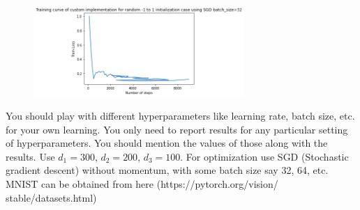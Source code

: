 \documentclass[a4paper]{article}
\theoremstyle{definition}
\newenvironment{soln}{
    \leavevmode\color{blue}\ignorespaces
}{}
\begin{document}
\begin{enumerate}
\begin{soln}
 \begin{figure}[hbt!]
		\centering
		\includegraphics[width=8cm]{images/q3.4(b)-random_init.png}
        \caption{} \label{fig:part4b}
	\end{figure}
        
    \end{soln}
\end{enumerate}

You should play with different hyperparameters like learning rate, batch size, etc. for your own learning. You only need to report results for any particular setting of hyperparameters. You should mention the values of those along with the results. Use $d_1 = 300$, $d_2 = 200$, $d_3 = 100$. For optimization use SGD (Stochastic gradient descent) without momentum, with some batch size say 32, 64, etc. MNIST can be obtained from here (https://pytorch.org/vision/ stable/datasets.html)


\end{document}
